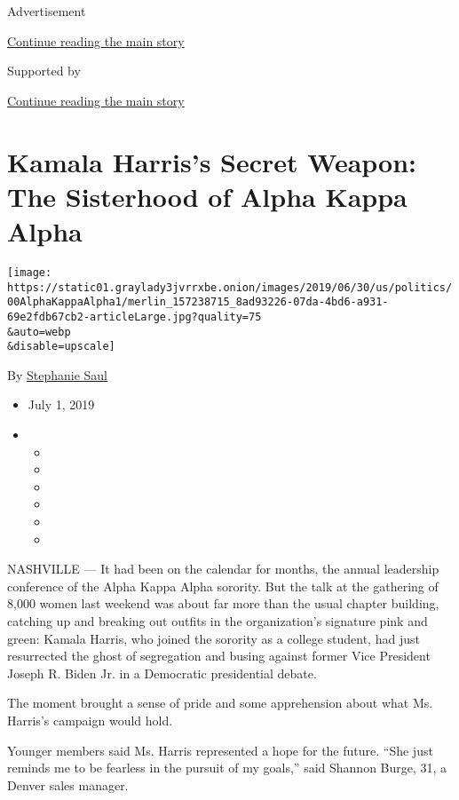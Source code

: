 Advertisement

\protect\hyperlink{after-top}{Continue reading the main story}

Supported by

\protect\hyperlink{after-sponsor}{Continue reading the main story}

\hypertarget{kamala-harriss-secret-weapon-the-sisterhood-of-alpha-kappa-alpha}{%
\section{Kamala Harris's Secret Weapon: The Sisterhood of Alpha Kappa
Alpha}\label{kamala-harriss-secret-weapon-the-sisterhood-of-alpha-kappa-alpha}}

\texttt{[image: https://static01.graylady3jvrrxbe.onion/images/2019/06/30/us/politics/00AlphaKappaAlpha1/merlin\_157238715\_8ad93226-07da-4bd6-a931-69e2fdb67cb2-articleLarge.jpg?quality=75\\\&auto=webp\\\&disable=upscale]}

By \href{https://www.nytimes3xbfgragh.onion/by/stephanie-saul}{Stephanie
Saul}

\begin{itemize}
\item
  July 1, 2019
\item
  \begin{itemize}
  \item
  \item
  \item
  \item
  \item
  \item
  \end{itemize}
\end{itemize}

NASHVILLE --- It had been on the calendar for months, the annual
leadership conference of the Alpha Kappa Alpha sorority. But the talk at
the gathering of 8,000 women last weekend was about far more than the
usual chapter building, catching up and breaking out outfits in the
organization's signature pink and green: Kamala Harris, who joined the
sorority as a college student, had just resurrected the ghost of
segregation and busing against former Vice President Joseph R. Biden Jr.
in a Democratic presidential debate.

The moment brought a sense of pride and some apprehension about what Ms.
Harris's campaign would hold.

Younger members said Ms. Harris represented a hope for the future. ``She
just reminds me to be fearless in the pursuit of my goals,'' said
Shannon Burge, 31, a Denver sales manager.

